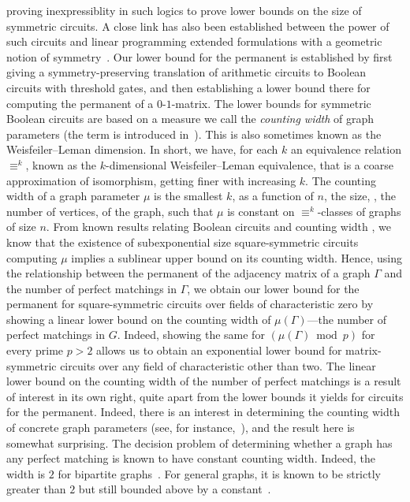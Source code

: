 \documentclass{toc}
\begin{document}
proving inexpressiblity in such logics to prove lower bounds on the size of
symmetric circuits. A close link has also been established between the power of
such circuits and linear programming extended formulations with a geometric
notion of symmetry~\cite{AtseriasDO19}. Our lower bound for the permanent is
established by first giving a symmetry-preserving translation of arithmetic
circuits to Boolean circuits with threshold gates, and then establishing a lower
bound there for computing the permanent of a $0$-$1$-matrix.
The lower bounds for symmetric Boolean circuits are based on a measure we call
the \emph{counting width} of graph parameters (the term is introduced
in~\cite{DawarW17}). This is also sometimes known as the Weisfeiler--Leman
dimension. In short, we have, for each $k$ an equivalence relation $\equiv^k$,
known as the $k$-dimensional Weisfeiler--Leman equivalence, that is a coarse
approximation of isomorphism, getting finer with increasing $k$. The counting
width of a graph parameter $\mu$ is the smallest $k$, as a function of
%
%
$n$, the size, \ie, the number of vertices, of the graph,  %
%
%
%
%
such that $\mu$ is constant on $\equiv^k$-classes of graphs of size
$n$. From known results relating Boolean circuits and counting
width \cite{AndersonD17,AtseriasDO19}, we know that the existence of
subexponential size square-symmetric circuits computing $\mu$ implies a sublinear upper
bound on its counting width.  Hence, using the relationship between the
permanent of the adjacency matrix of a graph $\Gamma$ and the number of
perfect matchings in $\Gamma$, we obtain our lower bound for the permanent
for square-symmetric circuits over fields of characteristic zero by showing a
linear lower bound on the counting width of $\mu(\Gamma)$---the number of perfect
matchings in $G$. Indeed, showing the same for $(\mu(\Gamma) \bmod p)$ for every
prime $p > 2$ allows us to obtain an exponential lower bound for
matrix-symmetric circuits over any field of characteristic other than two.
The linear lower bound on the counting width of the number of perfect matchings
is a result of interest in its own right, quite apart from the lower bounds it
yields for circuits for the permanent. Indeed, there is an interest in
determining the counting width of concrete graph parameters (see, for
instance,~\cite{ArvindFKV19}), and the result here is somewhat surprising. The
decision problem of determining whether a graph has any perfect matching is
known to have constant counting width. Indeed, the width is $2$ for bipartite
graphs~\cite{BlassGS02}. For general graphs, it is known to be strictly greater
than $2$ but still bounded above by a constant~\cite{AndersonDH15}.
\end{document}
